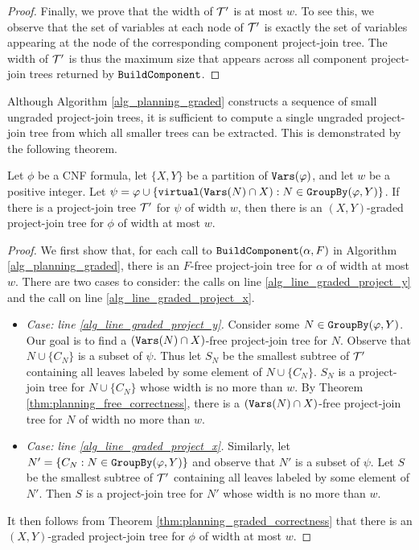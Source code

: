 \begin{proof}
Finally, we prove that the width of $\mathcal{T}'$ is at most $w$. To see this, we observe that the set of variables at each node of $\mathcal{T}'$ is exactly the set of variables appearing at the node of the corresponding component project-join tree. The width of $\mathcal{T}'$ is thus the maximum size that appears across all component project-join trees returned by $\texttt{\upshape BuildComponent}$. 
\end{proof}

Although Algorithm \ref{alg_planning_graded} constructs a sequence of small ungraded project-join trees, it is sufficient to compute a single ungraded project-join tree from which all smaller trees can be extracted. This is demonstrated by the following theorem.
\begin{theorem}
\label{thm:graded_from_virtual}
Let $\phi$ be a CNF formula, let $\{X, Y\}$ be a partition of $\texttt{\upshape Vars}(\varphi)$, and let $w$ be a positive integer. Let $\psi = \varphi \cup \{\texttt{\upshape virtual}(\texttt{\upshape Vars}(N)\cap X) : N \in \texttt{\upshape GroupBy}(\varphi, Y)\}$.
If there is a project-join tree $\mathcal{T}'$ for $\psi$ of width $w$, then there is an $(X,Y)$-graded project-join tree for $\phi$ of width at most $w$.
\end{theorem}
\begin{proof}
We first show that, for each call to $\texttt{\upshape BuildComponent}(\alpha, F)$ in Algorithm \ref{alg_planning_graded}, there is an $F$-free project-join tree for $\alpha$ of width at most $w$. There are two cases to consider: the calls on line \ref{alg_line_graded_project_y} and the call on line \ref{alg_line_graded_project_x}.
\begin{itemize}
    \item \textit{Case: line \ref{alg_line_graded_project_y}.} Consider some $N \in \texttt{\upshape GroupBy}(\varphi, Y)$. Our goal is to find a $(\texttt{\upshape Vars}(N) \cap X)$-free project-join tree for $N$. Observe that $N \cup \{C_N\}$ is a subset of $\psi$. Thus let $S_N$ be the smallest subtree of $\mathcal{T}'$ containing all leaves labeled by some element of $N \cup \{C_N\}$. $S_N$ is a project-join tree for $N \cup \{C_N\}$ whose width is no more than $w$. By Theorem  \ref{thm:planning_free_correctness}, there is a $(\texttt{\upshape Vars}(N) \cap X)$-free project-join tree for $N$ of width no more than $w$.
    
    \item \textit{Case: line \ref{alg_line_graded_project_x}.} Similarly, let $N' = \{C_N : N \in \texttt{\upshape GroupBy}(\varphi, Y)\}$ and observe that $N'$ is a subset of $\psi$. Let $S$ be the smallest subtree of $\mathcal{T}'$ containing all leaves labeled by some element of $N'$. Then $S$ is a project-join tree for $N'$ whose width is no more than $w$. 
\end{itemize}

It then follows from Theorem \ref{thm:planning_graded_correctness} that there is an $(X,Y)$-graded project-join tree for $\phi$ of width at most $w$. 
\end{proof}


